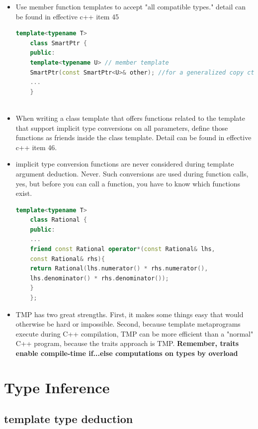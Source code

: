 \documentclass[a4paper,11pt,twoside]{book}
\begin{document}
\begin{itemize}
	\item Use member function templates to accept
	"all compatible types." detail can be found in effective c++ item 45
	
	\begin{lstlisting}[frame=single, language=c++]
	template<typename T>
	class SmartPtr {
	public:
	template<typename U> // member template
	SmartPtr(const SmartPtr<U>& other); //for a generalized copy ctor
	...
	}
	
	\end{lstlisting}
	
	\item When writing a class template that offers functions related to the template that support implicit type conversions on all parameters, define those functions as friends inside the class template. Detail can be found in effective c++ item 46.
	
	\item  implicit type conversion functions are never considered
	during template argument deduction. Never. Such conversions are
	used during function calls, yes, but before you can call a function, you have to know which functions exist. 
	
	\begin{lstlisting}[frame=single, language=c++]
	template<typename T>
	class Rational {
	public:
	...
	friend const Rational operator*(const Rational& lhs, 
	const Rational& rhs){
	return Rational(lhs.numerator() * rhs.numerator(), 
	lhs.denominator() * rhs.denominator());  
	} 
	};
	\end{lstlisting}
	
	\item TMP has two great strengths. First, it makes some things easy that would otherwise be hard or impossible. Second, because template metaprograms execute during C++ compilation, TMP can be more efficient than a "normal" C++ program, because the traits approach is TMP. \textbf{Remember, traits enable compile-time if...else computations on types by overload}
\end{itemize}



\section{Type Inference}

\subsection{template type deduction}
\end{document}
